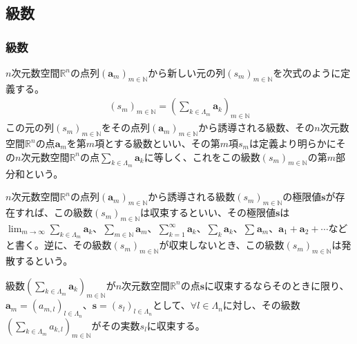 \documentclass[dvipdfmx]{jsarticle}
\begin{document}
\subsection{級数}%
\subsubsection{級数}%
\begin{dfn}
$n$次元数空間$\mathbb{R}^{n}$の点列$\left( \mathbf{a}_{m} \right)_{m \in \mathbb{N}}$から新しい元の列$\left( s_{m} \right)_{m \in \mathbb{N}}$を次式のように定義する。
\begin{align*}
\left( s_{m} \right)_{m \in \mathbb{N}} = \left( \sum_{k \in \varLambda_{m}} \mathbf{a}_{k} \right)_{m \in \mathbb{N}}
\end{align*}
この元の列$\left( s_{m} \right)_{m \in \mathbb{N}}$をその点列$\left( \mathbf{a}_{m} \right)_{m \in \mathbb{N}}$から誘導される級数、その$n$次元数空間$\mathbb{R}^{n}$の点$\mathbf{a}_{m}$を第$m$項とする級数といい、その第$m$項$s_{m}$は定義より明らかにその$n$次元数空間$\mathbb{R}^{n}$の点$\sum_{k \in \varLambda_{m}} \mathbf{a}_{k}$に等しく、これをこの級数$\left( s_{m} \right)_{m \in \mathbb{N}}$の第$m$部分和という。
\end{dfn}
\begin{dfn}
$n$次元数空間$\mathbb{R}^{n}$の点列$\left( \mathbf{a}_{m} \right)_{m \in \mathbb{N}}$から誘導される級数$\left( s_{m} \right)_{m \in \mathbb{N}}$の極限値$\mathbf{s}$が存在すれば、この級数$\left( s_{m} \right)_{m \in \mathbb{N}}$は収束するといい、その極限値$\mathbf{s}$は$\lim_{m \rightarrow \infty}{\sum_{k \in \varLambda_{m}} \mathbf{a}_{k}}$、$\sum_{m \in \mathbb{N}} \mathbf{a}_{m}$、$\sum_{k = 1}^{\infty}\mathbf{a}_{k}$、$\sum_{k} \mathbf{a}_{k}$、$\sum_{} \mathbf{a}_{m}$、$\mathbf{a}_{1} + \mathbf{a}_{2} + \cdots$などと書く。逆に、その級数$\left( s_{m} \right)_{m \in \mathbb{N}}$が収束しないとき、この級数$\left( s_{m} \right)_{m \in \mathbb{N}}$は発散するという。
\end{dfn}
\begin{thm}\label{4.1.8.1}
級数$\left( \sum_{k \in \varLambda_{m}} \mathbf{a}_{k} \right)_{m \in \mathbb{N}}$が$n$次元数空間$\mathbb{R}^{n}$の点$\mathbf{s}$に収束するならそのときに限り、$\mathbf{a}_{m} = \left( a_{m,l} \right)_{l \in \varLambda_{n}}$、$\mathbf{s} = \left( s_{l} \right)_{l \in \varLambda_{n}}$として、$\forall l \in \varLambda_{n}$に対し、その級数$\left( \sum_{k \in \varLambda_{m}} a_{k,l} \right)_{m \in \mathbb{N}}$がその実数$s_{l}$に収束する。
\end{thm}
\end{document}
